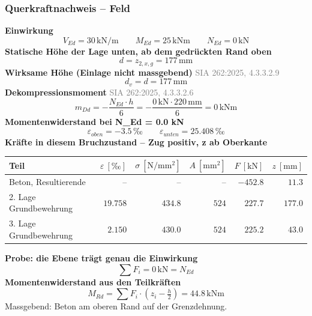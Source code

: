 \documentclass[11pt,a4paper]{article}
\newcommand{\normref}[1]{{\small\textcolor{gray}{#1}}}
\begin{document}
\subsubsection{Querkraftnachweis – Feld}
\noindent\textbf{Einwirkung}
\begin{equation*}
V_{Ed} = 30\,\mathrm{kN}/\mathrm{m} \qquad M_{Ed} = 25\,\mathrm{kNm} \qquad N_{Ed} = 0\,\mathrm{kN}
\end{equation*}
\noindent\textbf{Statische Höhe der Lage unten, ab dem gedrückten Rand oben}
\begin{equation*}
d = z_{2,x,g} = 177\,\mathrm{mm}
\end{equation*}
\noindent\textbf{Wirksame Höhe (Einlage nicht massgebend)} \hfill \normref{SIA 262:2025, 4.3.3.2.9}
\begin{equation*}
d_v = d = 177\,\mathrm{mm}
\end{equation*}
\noindent\textbf{Dekompressionsmoment} \hfill \normref{SIA 262:2025, 4.3.3.2.6}
\begin{equation*}
m_{Dd} = -\frac{N_{Ed} \cdot h}{6} = -\frac{0\,\mathrm{kN} \cdot 220\,\mathrm{mm}}{6} = 0\,\mathrm{kNm}
\end{equation*}
\noindent\textbf{Momentenwiderstand bei N\_Ed = 0.0 kN}
\begin{equation*}
\varepsilon_{oben} = -3.5\,\text{‰} \qquad \varepsilon_{unten} = 25.408\,\text{‰}
\end{equation*}
\noindent\textbf{Kräfte in diesem Bruchzustand – Zug positiv, z ab Oberkante}
\begin{longtable}{lrrrrr}
\hline
Teil & $\varepsilon\ [‰]$ & $\sigma\ [\mathrm{N/mm^2}]$ & $A\ [\mathrm{mm}^2]$ & $F\ [\mathrm{kN}]$ & $z\ [\mathrm{mm}]$ \\
\hline
\endhead
Beton, Resultierende & $–$ & $–$ & $–$ & $-452.8$ & $11.3$ \\
2. Lage Grundbewehrung & $19.758$ & $434.8$ & $524$ & $227.7$ & $177.0$ \\
3. Lage Grundbewehrung & $2.150$ & $430.0$ & $524$ & $225.2$ & $43.0$ \\
\hline
\end{longtable}
\noindent\textbf{Probe: die Ebene trägt genau die Einwirkung}
\begin{equation*}
\sum F_i = 0\,\mathrm{kN} = N_{Ed}
\end{equation*}
\noindent\textbf{Momentenwiderstand aus den Teilkräften}
\begin{equation*}
M_{Rd} = \sum F_i \cdot \left(z_i - \tfrac{h}{2}\right) = 44.8\,\mathrm{kNm}
\end{equation*}
Massgebend: Beton am oberen Rand auf der Grenzdehnung.
\end{document}
